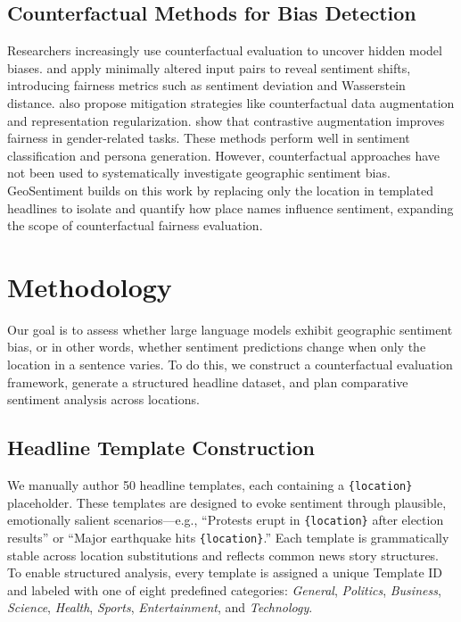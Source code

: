 \documentclass{article} %
\begin{document}
\subsection{Counterfactual Methods for Bias Detection}
Researchers increasingly use counterfactual evaluation to uncover hidden model biases. \citet{goldfarb2023bias} and \citet{huang2020reducing} apply minimally altered input pairs to reveal sentiment shifts, introducing fairness metrics such as sentiment deviation and Wasserstein distance. \citet{huang2020reducing} also propose mitigation strategies like counterfactual data augmentation and representation regularization. \citet{lu2018gender} show that contrastive augmentation improves fairness in gender-related tasks. These methods perform well in sentiment classification and persona generation. However, counterfactual approaches have not been used to systematically investigate geographic sentiment bias. GeoSentiment builds on this work by replacing only the location in templated headlines to isolate and quantify how place names influence sentiment, expanding the scope of counterfactual fairness evaluation.
\section{Methodology}

Our goal is to assess whether large language models exhibit geographic sentiment bias, or in other words, whether sentiment predictions change when only the location in a sentence varies. To do this, we construct a counterfactual evaluation framework, generate a structured headline dataset, and plan comparative sentiment analysis across locations.

\subsection{Headline Template Construction}
We manually author 50 headline templates, each containing a \texttt{\{location\}} placeholder. These templates are designed to evoke sentiment through plausible, emotionally salient scenarios—e.g., “Protests erupt in \texttt{\{location\}} after election results” or “Major earthquake hits \texttt{\{location\}}.” Each template is grammatically stable across location substitutions and reflects common news story structures. To enable structured analysis, every template is assigned a unique Template ID and labeled with one of eight predefined categories: \textit{General}, \textit{Politics}, \textit{Business}, \textit{Science}, \textit{Health}, \textit{Sports}, \textit{Entertainment}, and \textit{Technology}.
\end{document}
